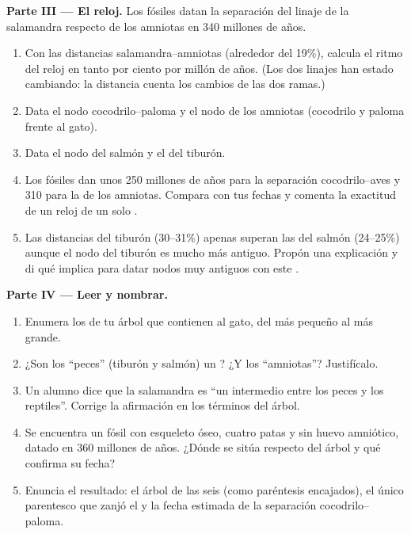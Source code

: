 \begin{problem}
\medskip
\noindent\textbf{Parte III --- El reloj.}
Los fósiles datan la separación del linaje de la salamandra respecto de
los amniotas en 340 millones de años.
\begin{enumerate}[resume]
  \item Con las distancias salamandra--amniotas (alrededor del 19\%),
        calcula el ritmo del reloj en tanto por ciento por millón de
        años. (Los dos linajes han estado cambiando: la distancia
        cuenta los cambios de las dos ramas.)
  \item Data el nodo cocodrilo--paloma y el nodo de los amniotas
        (cocodrilo y paloma frente al gato).
  \item Data el nodo del salmón y el del tiburón.
  \item Los fósiles dan unos 250 millones de años para la separación
        cocodrilo--aves y 310 para la de los amniotas. Compara con tus
        fechas y comenta la exactitud de un reloj de un solo .
  \item Las distancias del tiburón (30--31\%) apenas superan las del
        salmón (24--25\%) aunque el nodo del tiburón es mucho más
        antiguo. Propón una explicación y di qué implica para datar
        nodos muy antiguos con este .
\end{enumerate}

\medskip
\noindent\textbf{Parte IV --- Leer y nombrar.}
\begin{enumerate}[resume]
  \item Enumera los  de tu árbol que contienen al gato, del más
        pequeño al más grande.
  \item ¿Son los ``peces'' (tiburón y salmón) un ? ¿Y los
        ``amniotas''? Justifícalo.
  \item Un alumno dice que la salamandra es ``un intermedio entre los
        peces y los reptiles''. Corrige la afirmación en los términos
        del árbol.
  \item Se encuentra un fósil con esqueleto óseo, cuatro patas y sin
        huevo amniótico, datado en 360 millones de años. ¿Dónde se
        sitúa respecto del árbol y qué confirma su fecha?
  \item Enuncia el resultado: el árbol de las seis  (como
        paréntesis encajados), el único parentesco que zanjó el  y
        la fecha estimada de la separación cocodrilo--paloma.
\end{enumerate}
\end{problem}
